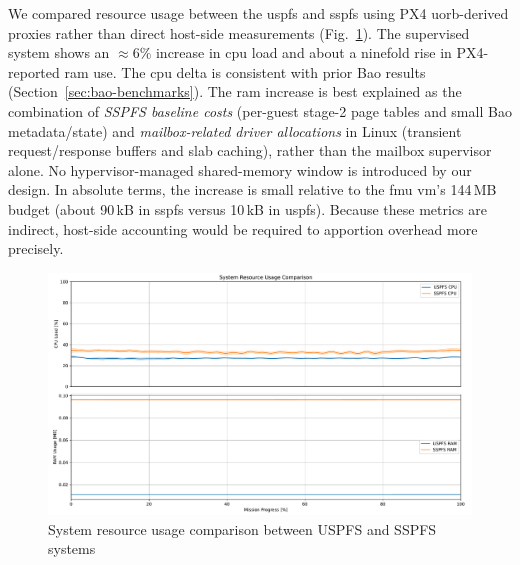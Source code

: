 We compared resource usage between the \gls{uspfs} and \gls{sspfs} using
PX4 \gls{uorb}-derived proxies rather than direct host-side measurements
(Fig.~\ref{fig:sys-resources-cmp}). The supervised system shows an
\(\approx 6\%\) increase in \gls{cpu} load and about a ninefold rise in
PX4-reported \gls{ram} use. The \gls{cpu} delta is consistent with prior Bao
results (Section~\ref{sec:bao-benchmarks}). The \gls{ram} increase is best
explained as the combination of \emph{SSPFS baseline costs} (per-guest
stage-2 page tables and small Bao metadata/state) and \emph{mailbox-related
driver allocations} in Linux (transient request/response buffers and slab
caching), rather than the mailbox supervisor alone. No hypervisor-managed
shared-memory window is introduced by our design. In absolute terms, the
increase is small relative to the \gls{fmu} \gls{vm}'s 144\,MB budget
(about 90\,kB in \gls{sspfs} versus 10\,kB in \gls{uspfs}). Because these
metrics are indirect, host-side accounting would be required to apportion
overhead more precisely.

\begin{figure}[!hbt]
  \centering
  \includegraphics[width=1.0\textwidth]{./img/pdf/sys-resources-cmp} 
  \caption{System resource usage comparison between USPFS and SSPFS systems}%
  \label{fig:sys-resources-cmp}
\end{figure}

